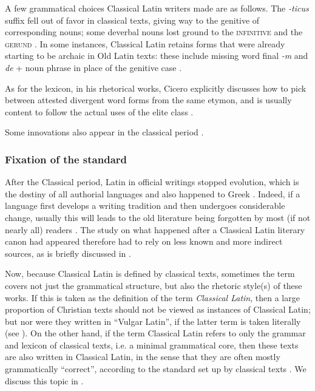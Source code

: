 \documentclass[a4paper, oneside, 12pt]{report}
\newcommand*{\citesec}[1]{\S~{#1}}
\newcommand*{\citepage}[1]{p.~{#1}}
\newcommand*{\citepages}[1]{pp.~{#1}}
\newcommand*{\term}[1]{\emph{#1}}
\newcommand{\form}[1]{\emph{#1}}
\newcommand*{\category}[1]{\textsc{#1}}
\begin{document}
A few grammatical choices Classical Latin writers made are as follows. 
The \form{-ticus} suffix fell out of favor in classical texts, giving way to the genitive of corresponding nouns; 
some deverbal nouns lost ground to the \category{infinitive} and the \category{gerund} \citep[\citepages{208-209}]{clackson2011blackwell}.
In some instances, Classical Latin retains forms that were already starting to be archaic in Old Latin texts: 
these include missing word final \form{-m}
and \form{de} + noun phrase in place of the genitive case
\citep[\citesec{2.4.4}, \citesec{8.3.1}]{alkire2010romance}.

As for the lexicon,
in his rhetorical works, Cicero explicitly discusses how to pick between attested divergent word forms from the same etymon, and is usually content to follow the actual uses of the elite class \citep[\citepages{200-202}]{clackson2011blackwell}.

Some innovations also appear in the classical period \citep[\citepages{212-215}]{danckaert2017development}.

\subsubsection{Fixation of the standard}

After the Classical period,
Latin in official writings stopped evolution,
which is the destiny of all authorial languages
and also happened to Greek \citep[\citepages{71-72}]{leonhardt2013latin}.
Indeed, if a language first develops a writing tradition
and then undergoes considerable change,
usually this will leads to the old literature being forgotten by most (if not nearly all) readers
\citep[\citepage{144}]{leonhardt2013latin}. 
The study on what happened after a Classical Latin literary canon had appeared
therefore had to rely on less known and more indirect sources,
as is briefly discussed in .

Now, because Classical Latin is defined by classical texts, 
sometimes the term covers not just the grammatical structure, but also the rhetoric style(s) of these works. If this is taken as the definition of the term \term{Classical Latin}, 
then a large proportion of Christian texts should not be viewed as instances of Classical Latin; but nor were they written in ``Vulgar Latin'', if the latter term is taken literally (see ).
On the other hand, if the term Classical Latin refers to only the grammar and lexicon of classical texts, i.e. a minimal grammatical core,
then these texts are also written in Classical Latin, in the sense that they are often mostly grammatically ``correct'', according to the standard set up by classical texts \citep[\citepage{117}]{leonhardt2013latin}.
We discuss this topic in .
\end{document}
